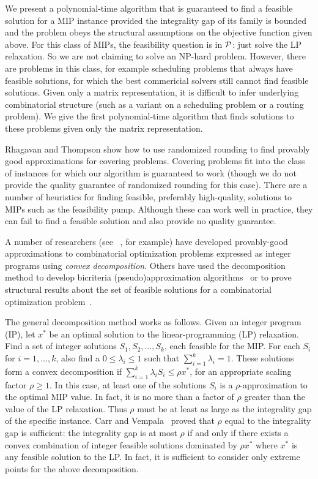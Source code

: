 \documentclass[11pt]{article}
\begin{document}
We present a polynomial-time algorithm that is guaranteed to find a
feasible solution for a MIP instance provided the integrality gap of
its family is bounded and the problem obeys the structural assumptions
on the objective function given above.  For this class of MIPs, the
feasibility question is in ${\cal P}$: just solve the LP relaxation.
So we are not claiming to solve an NP-hard problem.  However, there
are problems in this class, for example scheduling problems that
always have feasible solutions, for which the best commericial solvers
still cannot find feasible solutions.  Given only a matrix
representation, it is difficult to infer underlying combinatorial
structure (such as a variant on a scheduling problem or a routing
problem).  We give the first polynomial-time algorithm that finds
solutions to these problems given only the matrix representation.

Rhagavan and Thompson\cite{RT87} show how to use randomized rounding
to find provably good approximations for covering problems.  Covering
problems fit into the class of instances for which our algorithm is
guaranteed to work (though we do not provide the quality guarantee of
randomized rounding for this case).  There are a number of heuristics
for finding feasible, preferably high-quality, solutions to MIPs such
as the feasibility pump\cite{FGL05}.  Although these can work well in
practice, they can fail to find a feasible solution and also provide
no quality guarantee.

A number of researchers (see
~\cite{BarNoyGNS01,Naor+Schieber:shallow-trees,PhillipsUW2000,Srinivasan+Teo:STOC97},
for example) have developed provably-good approximations to
combinatorial optimization problems expressed as integer programs
using {\em convex decomposition}.  Others have used the decomposition
method to develop bicriteria (pseudo)approximation
algorithms~\cite{BurchCKMPS03} or to prove structural results about
the set of feasible solutions for a combinatorial optimization
problem~\cite{BoydCarr}.

The general decomposition method works as follows. Given an integer
program (IP), let $x^*$ be an optimal solution to the
linear-programming (LP) relaxation.  Find a set of integer solutions
$S_1, S_2, \ldots, S_k$, each feasible for the MIP.  For each $S_i$ for
$i = 1, \ldots, k$, also find a $0 \le \lambda_i \le 1$ such that
$\sum_{i=1}^k \lambda_i = 1$.  These solutions form a convex
decomposition if $\sum_{i=1}^k \lambda_i S_i \le \rho x^*$, for an
appropriate scaling factor $\rho \ge 1.$ In this case, at least one of
the solutions $S_i$ is a $\rho$-approximation to the optimal MIP value.
In fact, it is no more than a factor of $\rho$ greater than the value
of the LP relaxation.  Thus $\rho$ must be at least as large as the
integrality gap of the specific instance.  Carr and
Vempala~\cite{CarrVempala} proved that $\rho$ equal to the integrality
gap is sufficient: the integrality gap is at most $\rho$ if and only
if there exists a convex combination of integer feasible solutions
dominated by $\rho x^*$ where $x^*$ is any feasible solution to the
LP.  In fact, it is sufficient to consider only extreme points for the above
decomposition.
\end{document}
